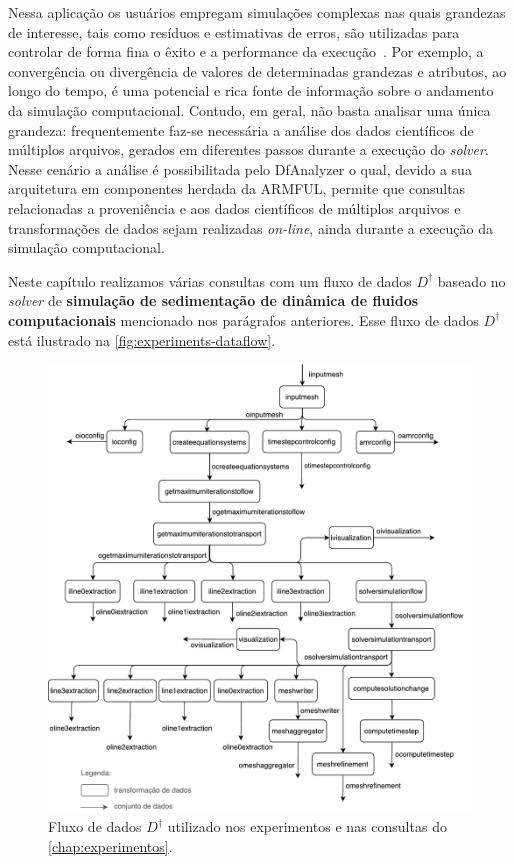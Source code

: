 Nessa aplicação os usuários empregam simulações complexas nas quais grandezas de interesse, tais como resíduos e estimativas de erros, são utilizadas para controlar de forma fina o êxito e a performance da execução~\cite{silva2016situ}. Por exemplo, a convergência ou divergência de valores de determinadas grandezas e atributos, ao longo do tempo, é uma potencial e rica fonte de informação sobre o andamento da simulação computacional. Contudo, em geral, não basta analisar uma única grandeza: frequentemente faz-se necessária a análise dos dados científicos de múltiplos arquivos, gerados em diferentes passos durante a execução do \textit{solver}. Nesse cenário a análise é possibilitada pelo DfAnalyzer o qual, devido a sua arquitetura em componentes herdada da ARMFUL, permite que consultas relacionadas a proveniência e aos dados científicos de múltiplos arquivos e transformações de dados sejam realizadas \textit{on-line}, ainda durante a execução da simulação computacional.

Neste capítulo realizamos várias consultas com um fluxo de dados \(D^{\dagger}\) baseado no \textit{solver} de \textbf{simulação de sedimentação de dinâmica de fluidos computacionais} mencionado nos parágrafos anteriores. Esse fluxo de dados \(D^{\dagger}\) está ilustrado na \autoref{fig:experiments-dataflow}.

\begin{figure}[!htb]
    \centering
    \includegraphics[width=\textwidth]{img/experiments-dataflow}
    \caption[Fluxo de dados $D^{\dagger}$ utilizado nos experimentos]{Fluxo de dados $D^{\dagger}$ utilizado nos experimentos e nas consultas do \autoref{chap:experimentos}.}%
    \label{fig:experiments-dataflow}
\end{figure}

